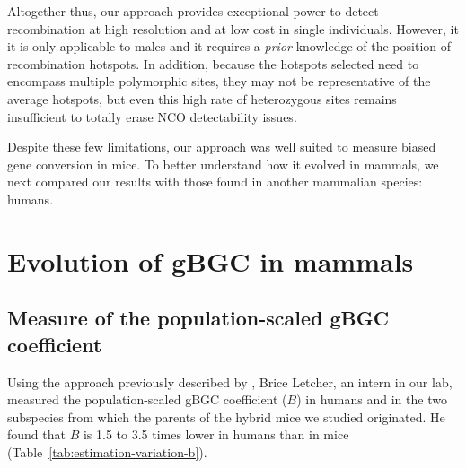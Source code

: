 


Altogether thus, our approach provides exceptional power to detect recombination at high resolution and at low cost in single individuals.
However, it it is only applicable to males and it requires a \textit{prior} knowledge of the position of recombination hotspots.
In addition, because the hotspots selected need to encompass multiple polymorphic sites, they may not be representative of the average hotspots, but even this high rate of heterozygous sites remains insufficient to totally erase NCO detectability issues.

Despite these few limitations, our approach was well suited to measure biased gene conversion in mice. 
To better understand how it evolved in mammals, we next compared our results with those found in another mammalian species: humans.


\section{Evolution of gBGC in mammals}
\subsection{Measure of the population-scaled gBGC coefficient}




Using the approach previously described by \citet{glemin2015quantification}, Brice Letcher, an intern in our lab, measured the population-scaled gBGC coefficient ($B$) in humans and in the two subspecies from which the parents of the hybrid mice we studied originated.
He found that $B$ is 1.5 to 3.5 times lower in humans than in mice (Table~\ref{tab:estimation-variation-b}).


